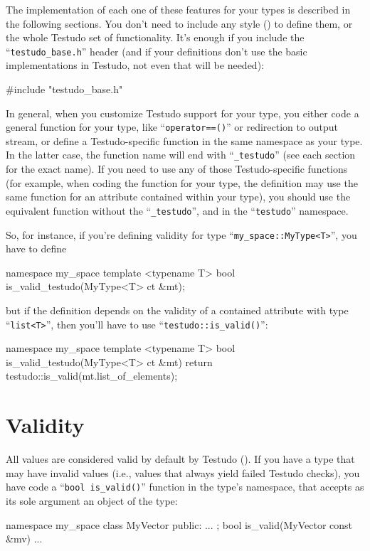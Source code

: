 \documentclass[twoside, a4paper, article]{memoir}
\begin{document}
The implementation of each one of these features for your types is described in
the following sections.  You don't need to include any style
() to define them, or the
whole Testudo set of functionality.  It's enough if you include the
``\texttt{testudo\_base.h}'' header (and if your definitions don't use the
basic implementations in Testudo, not even that will be needed):
\begin{cpplisting}
#include "testudo_base.h"
\end{cpplisting}

In general, when you customize Testudo support for your type, you either code a
general function for your type, like ``\texttt{operator==()}'' or redirection
to output stream, or define a Testudo-specific function in the same namespace
as your type.  In the latter case, the function name will end with
``\texttt{\_testudo}'' (see each section for the exact name).  If you need to
use any of those Testudo-specific functions (for example, when coding the
function for your type, the definition may use the same function for an
attribute contained within your type), you should use the equivalent function
without the ``\texttt{\_testudo}'', and in the ``\texttt{testudo}'' namespace.

So, for instance, if you're defining validity for type
``\texttt{my\_space::MyType<T>}'', you have to define
\begin{cpplisting}
namespace my_space {
  template <typename T>
  bool is_valid_testudo(MyType<T> ct &mt);
}
\end{cpplisting}
but if the definition depends on the validity of a contained attribute with
type ``\texttt{list<T>}'', then you'll have to use
``\texttt{testudo::is\_valid()}'':
\begin{cpplisting}
namespace my_space {
  template <typename T>
  bool is_valid_testudo(MyType<T> ct &mt) {
    return testudo::is_valid(mt.list_of_elements);
  }
}
\end{cpplisting}


\section{Validity}
\label{sec:validity}

All values are considered valid by default by Testudo
().  If you have a type that may have invalid
values (i.e., values that always yield failed Testudo checks), you have code a
``\texttt{bool is\_valid()}'' function in the type's namespace, that accepts as
its sole argument an object of the type:
\begin{cpplisting}
namespace my_space {
  class MyVector {
  public:
    ...
  };
  bool is_valid(MyVector const &mv) { ... }
}
\end{cpplisting}
\end{document}

